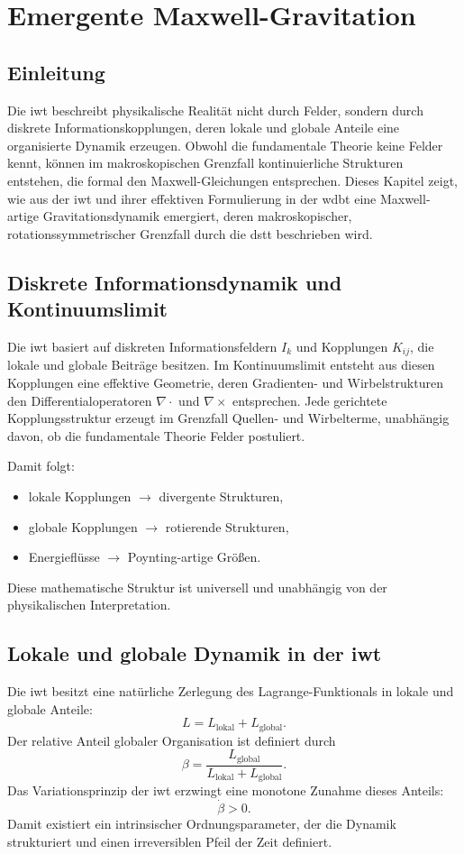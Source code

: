\chapter{Emergente Maxwell-Gravitation}

\section{Einleitung}
Die \gls{iwt} beschreibt physikalische Realität nicht durch Felder, sondern durch diskrete Informationskopplungen, deren lokale und globale Anteile eine organisierte Dynamik erzeugen. Obwohl die fundamentale Theorie keine Felder kennt, können im makroskopischen Grenzfall kontinuierliche Strukturen entstehen, die formal den Maxwell-Gleichungen entsprechen. Dieses Kapitel zeigt, wie aus der \gls{iwt} und ihrer effektiven Formulierung in der \gls{wdbt} eine Maxwell-artige Gravitationsdynamik emergiert, deren makroskopischer, rotationssymmetrischer Grenzfall durch die \gls{dstt} beschrieben wird.

\section{Diskrete Informationsdynamik und Kontinuumslimit}
Die \gls{iwt} basiert auf diskreten Informationsfeldern $I_k$ und Kopplungen $K_{ij}$, die lokale und globale Beiträge besitzen. Im Kontinuumslimit entsteht aus diesen Kopplungen eine effektive Geometrie, deren Gradienten- und Wirbelstrukturen den Differentialoperatoren $\nabla \cdot$ und $\nabla \times$ entsprechen. Jede gerichtete Kopplungsstruktur erzeugt im Grenzfall Quellen- und Wirbelterme, unabhängig davon, ob die fundamentale Theorie Felder postuliert.

Damit folgt:
\begin{itemize}
\item lokale Kopplungen $\rightarrow$ divergente Strukturen,
\item globale Kopplungen $\rightarrow$ rotierende Strukturen,
\item Energieflüsse $\rightarrow$ Poynting-artige Größen.
\end{itemize}
Diese mathematische Struktur ist universell und unabhängig von der physikalischen Interpretation.

\section{Lokale und globale Dynamik in der \gls{iwt}}
Die \gls{iwt} besitzt eine natürliche Zerlegung des Lagrange-Funktionals in lokale und globale Anteile:
\[
L = L_{\mathrm{lokal}} + L_{\mathrm{global}}.
\]
Der relative Anteil globaler Organisation ist definiert durch
\[
\beta = \frac{L_{\mathrm{global}}}{L_{\mathrm{lokal}} + L_{\mathrm{global}}}.
\]
Das Variationsprinzip der \gls{iwt} erzwingt eine monotone Zunahme dieses Anteils:
\[
\dot{\beta} > 0.
\]
Damit existiert ein intrinsischer Ordnungsparameter, der die Dynamik strukturiert und einen irreversiblen Pfeil der Zeit definiert.

